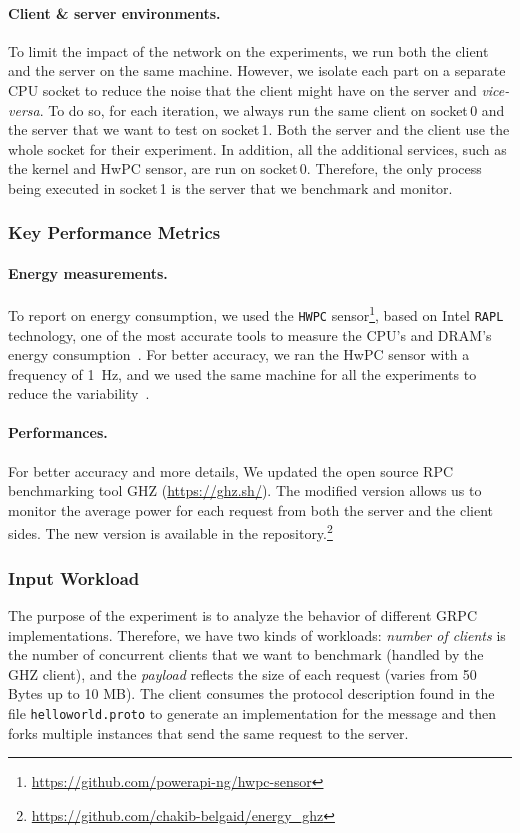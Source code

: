 \paragraph{Client \& server environments.}
To limit the impact of the network on the experiments, we run both the client and the server on the same machine.
However, we isolate each part on a separate CPU socket to reduce the noise that the client might have on the server and \emph{vice-versa}.
To do so, for each iteration, we always run the same client on \textsf{socket\,0} and the server that we want to test on \textsf{socket\,1}.
Both the server and the client use the whole socket for their experiment.
In addition, all the additional services, such as the kernel and HwPC sensor, are run on \textsf{socket\,0}.
Therefore, the only process being executed in \textsf{socket\,1} is the server that we benchmark and monitor.

\subsubsection{Key Performance Metrics}
\paragraph{Energy measurements.}
To report on energy consumption, we used the \texttt{HWPC} sensor\footnote{\url{https://github.com/powerapi-ng/hwpc-sensor}}, based on Intel \texttt{RAPL} technology, one of the most accurate tools to measure the CPU's and DRAM's energy consumption~\cite{hackenberg2013power,hackenberg2015energy}.
For better accuracy, we ran the HwPC sensor with a frequency of 1~Hz, and we used the same machine for all the experiments to reduce the variability~\cite{ilsche_power_2015}.

\paragraph{Performances.}
For better accuracy and more details, We updated the open source RPC benchmarking tool GHZ (\url{https://ghz.sh/}).
The modified version allows us to monitor the average power for each request from both the server and the client sides.
The new version is available in the repository.\footnote{\url{https://github.com/chakib-belgaid/energy_ghz}}

\subsubsection{Input Workload}
The purpose of the experiment is to analyze the behavior of different GRPC implementations.
Therefore, we have two kinds of workloads: \emph{number of clients} is the number of concurrent clients that we want to benchmark (handled by the GHZ client), and the \emph{payload} reflects the size of each request (varies from 50 Bytes up to 10 MB).
The client consumes the protocol description found in the file \texttt{helloworld.proto} to generate an implementation for the message and then forks multiple instances that send the same request to the server.


